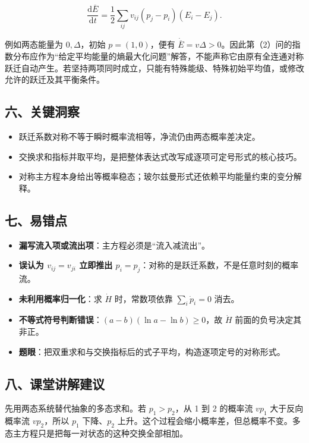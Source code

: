 \documentclass[12pt,a4paper,UTF8]{ctexart}
\newcommand{\tightlist}{\setlength{\itemsep}{0pt}\setlength{\parskip}{0pt}}
\begin{document}
\[\frac{\mathrm d\overline E}{\mathrm dt}=\frac12\sum_{ij}v_{ij}(p_j-p_i)(E_i-E_j).\]

例如两态能量为 \(0,\Delta\)，初始 \(p=(1,0)\)，便有
\(\dot{\overline E}=v\Delta>0\)。因此第（2）问的指数分布应作为``给定平均能量的熵最大化问题''解答，不能声称它由原有全连通对称跃迁自动产生。若坚持两项同时成立，只能有特殊能级、特殊初始平均值，或修改允许的跃迁及其平衡条件。

\subsection{六、关键洞察}\label{ux516dux5173ux952eux6d1eux5bdf-7}

\begin{itemize}
\tightlist
\item
  跃迁系数对称不等于瞬时概率流相等，净流仍由两态概率差决定。
\item
  交换求和指标并取平均，是把整体表达式改写成逐项可定号形式的核心技巧。
\item
  对称主方程本身给出等概率稳态；玻尔兹曼形式还依赖平均能量约束的变分解释。
\end{itemize}

\subsection{七、易错点}\label{ux4e03ux6613ux9519ux70b9-7}

\begin{itemize}
\tightlist
\item
  \textbf{漏写流入项或流出项}：主方程必须是``流入减流出''。
\item
  \textbf{误认为 \(v_{ij}=v_{ji}\) 立即推出
  \(p_i=p_j\)}：对称的是跃迁系数，不是任意时刻的概率流。
\item
  \textbf{未利用概率归一化}：求 \(\dot H\) 时，常数项依靠
  \(\sum_i\dot p_i=0\) 消去。
\item
  \textbf{不等式符号判断错误}：\((a-b)(\ln a-\ln b)\geq0\)，故
  \(\dot H\) 前面的负号决定其非正。
\item
  \textbf{题眼}：把双重求和与交换指标后的式子平均，构造逐项定号的对称形式。
\end{itemize}

\subsection{八、课堂讲解建议}\label{ux516bux8bfeux5802ux8bb2ux89e3ux5efaux8bae-7}

先用两态系统替代抽象的多态求和。若 \(p_1>p_2\)，从 1 到 2 的概率流
\(vp_1\) 大于反向概率流 \(vp_2\)，所以 \(p_1\) 下降、\(p_2\)
上升。这个过程会缩小概率差，但总概率不变。多态主方程只是把每一对状态的这种交换全部相加。
\end{document}
